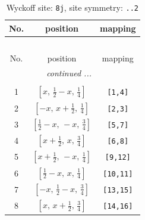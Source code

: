 \documentclass[fleqn,8pt]{jsarticle}
\begin{document}
\begin{longtable}{ccc}
\caption{Wyckoff site: {\tt 8j}, site symmetry: {\tt ..2}}
 \\
 \hline \hline
No. & position & mapping \\ \hline \endfirsthead

\multicolumn{2}{l}{\tablename\ \thetable{}} \\
 \hline \hline
No. & position & mapping \\ \hline \endhead

 \hline \hline
\multicolumn{2}{r}{\footnotesize\it continued ...} \\ \endfoot

 \hline \hline
\multicolumn{2}{r}{} \\ \endlastfoot

1 & $\left[ x,\, \frac{1}{2} - x,\, \frac{1}{4} \right]$ & {\tt [1,4]} \\ \hline
2 & $\left[ - x,\, x + \frac{1}{2},\, \frac{1}{4} \right]$ & {\tt [2,3]} \\ \hline
3 & $\left[ \frac{1}{2} - x,\, - x,\, \frac{3}{4} \right]$ & {\tt [5,7]} \\ \hline
4 & $\left[ x + \frac{1}{2},\, x,\, \frac{3}{4} \right]$ & {\tt [6,8]} \\ \hline
5 & $\left[ x + \frac{1}{2},\, - x,\, \frac{1}{4} \right]$ & {\tt [9,12]} \\ \hline
6 & $\left[ \frac{1}{2} - x,\, x,\, \frac{1}{4} \right]$ & {\tt [10,11]} \\ \hline
7 & $\left[ - x,\, \frac{1}{2} - x,\, \frac{3}{4} \right]$ & {\tt [13,15]} \\ \hline
8 & $\left[ x,\, x + \frac{1}{2},\, \frac{3}{4} \right]$ & {\tt [14,16]} \\
\end{longtable}
\renewcommand{\arraystretch}{1.2}
\end{document}
